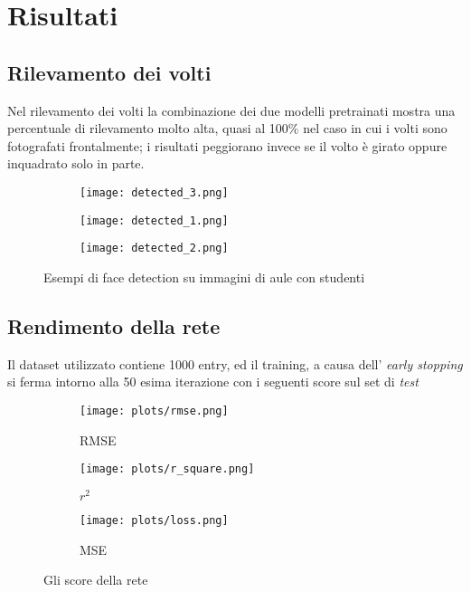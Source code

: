 \chapter{Risultati}

\section{Rilevamento dei volti}

Nel rilevamento dei volti la combinazione dei due modelli pretrainati mostra
una percentuale di rilevamento molto alta, quasi al 100\% nel caso in cui i volti sono 
fotografati frontalmente; i risultati peggiorano invece se il volto è girato oppure 
inquadrato solo in parte. 

\smallskip

\begin{figure}[h]
    \centering
    \begin{subfigure}[b]{0.7\linewidth}
      \texttt{[image: detected\_3.png]}
    \end{subfigure}

    \smallskip
    
    \begin{subfigure}[b]{0.7\linewidth}
        \texttt{[image: detected\_1.png]}
    \end{subfigure}

    \smallskip
    
    \begin{subfigure}[b]{0.7\linewidth}
        \texttt{[image: detected\_2.png]}
    \end{subfigure}
    \caption{Esempi di face detection su immagini di aule con studenti}
    \label{fig:example_opencv}
\end{figure}

\section{Rendimento della rete}

Il dataset utilizzato contiene 1000 entry, ed il training, a causa dell'
\textit{early stopping} si ferma intorno alla 50 esima iterazione con i seguenti 
score sul set di \textit{test}

\smallskip

\begin{figure}[h]
    \centering
    
    \begin{subfigure}[b]{0.45\linewidth}
        \texttt{[image: plots/rmse.png]}
        \caption{RMSE}
    \end{subfigure}
    \begin{subfigure}[b]{0.45\linewidth}
        \texttt{[image: plots/r\_square.png]}
        \caption{$r^2$}
    \end{subfigure}
    \begin{subfigure}[b]{0.9\linewidth}
        \texttt{[image: plots/loss.png]}
        \caption{MSE}
    \end{subfigure}
    \caption{Gli score della rete}
    \label{fig:example_opencv}
\end{figure}

